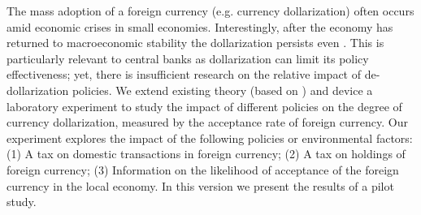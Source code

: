 The mass adoption of a foreign currency (e.g. currency dollarization) often occurs amid economic crises in  small economies. 
Interestingly, after the economy has returned to macroeconomic stability the dollarization persists even . 
This is particularly relevant to central banks as dollarization can limit its policy effectiveness; yet, there is insufficient research on the relative impact of de-dollarization policies.
We extend existing theory (based on \cite{RePEc:oup:restud:v:60:y:1993:i:2:p:283-307.}) and device a laboratory experiment to study the impact of different policies on the degree of currency dollarization, measured by the acceptance rate of foreign currency. 
Our experiment explores the impact of the following policies or environmental factors:
(1) A tax on domestic transactions in foreign currency;
(2) A tax on holdings of foreign currency;
(3) Information on the likelihood of acceptance of the foreign currency in the local economy.
In this version we present the results of a pilot study.




